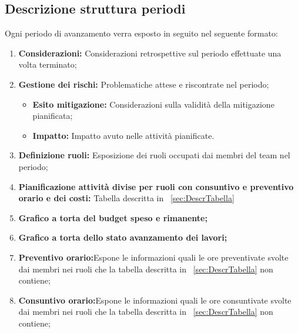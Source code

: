 \subsection{Descrizione struttura periodi}
Ogni periodo di avanzamento verra esposto in seguito nel seguente formato:
\begin{enumerate}
    \item \textbf{Considerazioni:} Considerazioni retrospettive sul periodo effettuate una volta terminato;
    \item \textbf{Gestione dei rischi:} Problematiche attese e riscontrate nel periodo;
        \begin{itemize}
            \item \textbf{Esito mitigazione:} Considerazioni sulla validità della mitigazione pianificata;
            \item \textbf{Impatto:} Impatto avuto nelle attività pianificate.
        \end{itemize}
    \item \textbf{Definizione ruoli:} Esposizione dei ruoli occupati dai membri del team nel periodo;
    \item \textbf{Pianificazione attività divise per ruoli con consuntivo e preventivo orario e dei costi:} Tabella descritta in ~\ref{sec:DescrTabella}
    \item \textbf{Grafico a torta del budget speso e rimanente;}
    \item \textbf{Grafico a torta dello stato avanzamento dei lavori;}
    \item \textbf{Preventivo orario:}Espone le informazioni quali le ore preventivate svolte dai membri nei ruoli che la tabella descritta in ~\ref{sec:DescrTabella} non contiene;
    \item \textbf{Consuntivo orario:}Espone le informazioni quali le ore consuntivate svolte dai membri nei ruoli che la tabella descritta in ~\ref{sec:DescrTabella} non contiene;


\end{enumerate}
